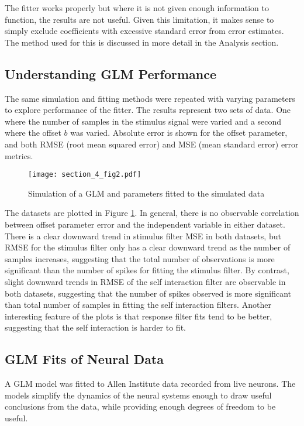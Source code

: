 \documentclass[letterpaper,titlepage,10pt]{article}
\begin{document}
The fitter works properly but where it is not given enough information to function, the results are not useful. Given
this limitation, it makes sense to simply exclude coefficients with excessive standard error from error estimates. The
method used for this is discussed in more detail in the Analysis section.

\subsection{Understanding GLM Performance}

The same simulation and fitting methods were repeated with varying parameters to explore performance of the fitter.
The results represent two sets of data. One where the number of samples in the stimulus signal were varied and a
second where the offset $b$ was varied. Absolute error is shown for the offset parameter, and both RMSE (root mean
squared error) and MSE (mean standard error) error metrics.

\begin{figure}[h]
\texttt{[image: section\_4\_fig2.pdf]}
\caption{Simulation of a GLM and parameters fitted to the simulated data}
\label{fig42}
\end{figure}

The datasets are plotted in Figure \ref{fig42}. In general, there is no observable correlation between offset parameter
error and the independent variable in either dataset. There is a clear downward trend in stimulus filter MSE in both
datasets, but RMSE for the stimulus filter only has a clear downward trend as the number of samples increases,
suggesting that the total number of observations is more significant than the number of spikes for fitting the stimulus
filter. By contrast, slight downward trends in RMSE of the self interaction filter are observable in both datasets,
suggesting that the number of spikes observed is more significant than total number of samples in fitting the self
interaction filters. Another interesting feature of the plots is that response filter fits tend to be better,
suggesting that the self interaction is harder to fit.

\subsection{GLM Fits of Neural Data}

A GLM model was fitted to Allen Institute data recorded from live neurons. The models simplify the dynamics of the
neural systems enough to draw useful conclusions from the data, while providing enough degrees of freedom to be useful.
\end{document}
